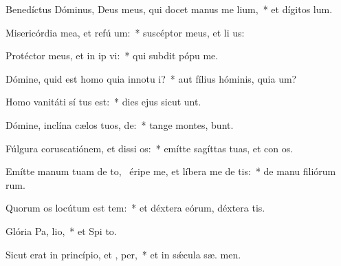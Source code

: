\item Benedíctus Dóminus, Deus meus, qui docet manus me  lium,~* et dígitos   lum.
\item Misericórdia mea, et refú um:~* suscéptor meus, et li us:
\item Protéctor meus, et in ip vi:~* qui subdit pópu   me.
\item Dómine, quid est homo quia innotu i?~* aut fílius hóminis, quia  um?
\item Homo vanitáti sí tus est:~* dies ejus sicut  unt.
\item Dómine, inclína cælos tuos,  de:~* tange montes,  bunt.
\item Fúlgura coruscatiónem, et dissi os:~* emítte sagíttas tuas, et con os.
\item Emítte manum tuam de to,~\pscross{} éripe me, et líbera me de  tis:~* de manu filiórum rum.
\item Quorum os locútum est tem:~* et déxtera eórum, déxtera tis.
\item Glória Pa,  lio,~* et Spi to.
\item Sicut erat in princípio, et ,  per,~* et in sǽcula sæ. men.
